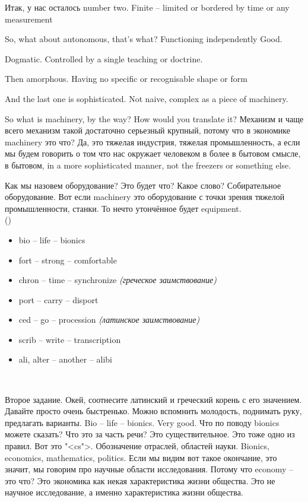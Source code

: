 \documentclass[main.tex]{subfiles}
\begin{document}
Итак, у нас осталось number two.
Finite -- limited or bordered by time or any measurement

So, what about autonomous, that's what?
Functioning independently
Good.

Dogmatic.
Controlled by a single teaching or doctrine.

Then amorphous.
Having no specific or recognisable shape or form

And the last one is sophisticated.
Not naive, complex as a piece of machinery.

So what is machinery, by the way?
How would you translate it?
Механизм и чаще всего механизм такой достаточно серьезный крупный, потому что в экономике machinery это что?
Да, это тяжелая индустрия, тяжелая промышленность, а если мы будем говорить о том что нас окружает человеком в более в бытовом смысле, в бытовом, in a more sophisticated manner, not the freezers or something else.

Как мы назовем оборудование? Это будет что? Какое слово? Собирательное оборудование.
Вот если machinery это оборудование с точки зрения тяжелой промышленности, станки.
То нечто утончённое будет equipment.
\\

\hypertarget{ltask:2023-11-29-2}{} (\hyperref[task:2023-11-29]{\color{blue}{перейти к тексту задания упр.2.6.2.}})

\begin{itemize}[nosep,leftmargin=*,label={}]
	\itemsep\eitsp
	\item bio -- life -- bionics
	\item fort -- strong -- comfortable
	\item chron -- time -- synchronize \textit{(греческое заимствование)}
	\item port -- carry -- disport
	\item ced -- go -- procession \textit{(латинское заимствование)}
	\item scrib -- write -- transcription
	\item ali, alter -- another -- alibi
\end{itemize}
\ 

Второе задание.
Окей, соотнесите латинский и греческий корень с его значением.
Давайте просто очень быстренько.
Можно вспомнить молодость, поднимать руку, предлагать варианты.
Bio -- life -- bionics.
Very good.
Что по поводу bionics можете сказать?
Что это за часть речи?
Это существительное.
Это тоже одно из правил.
Вот это "<cs">.
Обозначение отраслей, областей науки.
Bionics, economics, mathematics, politics.
Если мы видим вот такое окончание, это значит, мы говорим про научные области исследования.
Потому что economy -- это что?
Это экономика как некая характеристика жизни общества.
Это не научное исследование, а именно характеристика жизни общества.
\end{document}
